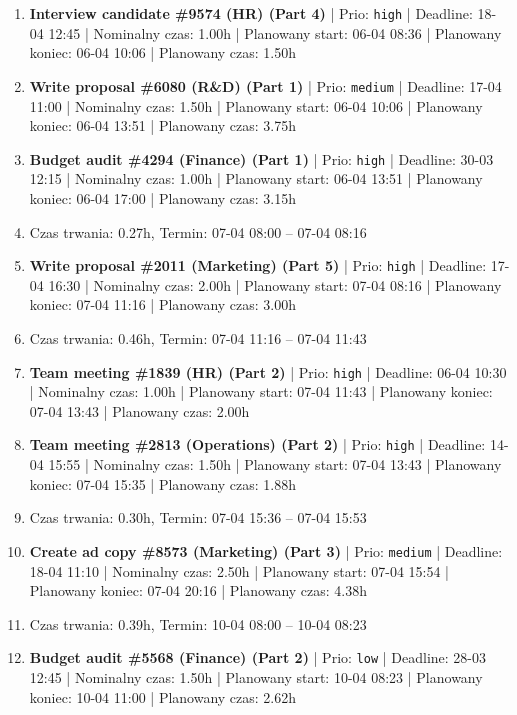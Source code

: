 {\begin{enumerate}
  \item [\textbf{14612}] \textbf{Interview candidate \#9574 (HR) (Part 4)} | Prio: \texttt{high} | Deadline: 18-04 12:45 | Nominalny czas: 1.00h | Planowany start: 06-04 08:36 | Planowany koniec: 06-04 10:06 | Planowany czas: 1.50h
  \item [\textbf{14669}] \textbf{Write proposal \#6080 (R\&D) (Part 1)} | Prio: \texttt{medium} | Deadline: 17-04 11:00 | Nominalny czas: 1.50h | Planowany start: 06-04 10:06 | Planowany koniec: 06-04 13:51 | Planowany czas: 3.75h
  \item [\textbf{14619}] \textbf{Budget audit \#4294 (Finance) (Part 1)} | Prio: \texttt{high} | Deadline: 30-03 12:15 | Nominalny czas: 1.00h | Planowany start: 06-04 13:51 | Planowany koniec: 06-04 17:00 | Planowany czas: 3.15h
  \item [\textbf{PRZERWA}] Czas trwania: 0.27h, Termin: 07-04 08:00 -- 07-04 08:16
  \item [\textbf{14628}] \textbf{Write proposal \#2011 (Marketing) (Part 5)} | Prio: \texttt{high} | Deadline: 17-04 16:30 | Nominalny czas: 2.00h | Planowany start: 07-04 08:16 | Planowany koniec: 07-04 11:16 | Planowany czas: 3.00h
  \item [\textbf{PRZERWA}] Czas trwania: 0.46h, Termin: 07-04 11:16 -- 07-04 11:43
  \item [\textbf{14610}] \textbf{Team meeting \#1839 (HR) (Part 2)} | Prio: \texttt{high} | Deadline: 06-04 10:30 | Nominalny czas: 1.00h | Planowany start: 07-04 11:43 | Planowany koniec: 07-04 13:43 | Planowany czas: 2.00h
  \item [\textbf{14617}] \textbf{Team meeting \#2813 (Operations) (Part 2)} | Prio: \texttt{high} | Deadline: 14-04 15:55 | Nominalny czas: 1.50h | Planowany start: 07-04 13:43 | Planowany koniec: 07-04 15:35 | Planowany czas: 1.88h
  \item [\textbf{PRZERWA}] Czas trwania: 0.30h, Termin: 07-04 15:36 -- 07-04 15:53
  \item [\textbf{14677}] \textbf{Create ad copy \#8573 (Marketing) (Part 3)} | Prio: \texttt{medium} | Deadline: 18-04 11:10 | Nominalny czas: 2.50h | Planowany start: 07-04 15:54 | Planowany koniec: 07-04 20:16 | Planowany czas: 4.38h
  \item [\textbf{PRZERWA}] Czas trwania: 0.39h, Termin: 10-04 08:00 -- 10-04 08:23
  \item [\textbf{14693}] \textbf{Budget audit \#5568 (Finance) (Part 2)} | Prio: \texttt{low} | Deadline: 28-03 12:45 | Nominalny czas: 1.50h | Planowany start: 10-04 08:23 | Planowany koniec: 10-04 11:00 | Planowany czas: 2.62h

\end{enumerate}}
